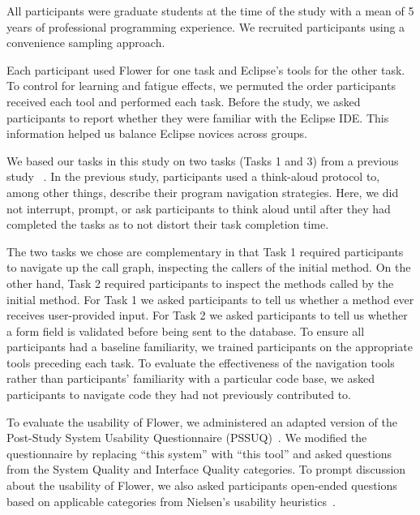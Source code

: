 \documentclass[conference]{IEEEtran}
\begin{document}
All participants were graduate students at the time of the study with a mean of 5 years of professional programming experience. 
We recruited participants using a convenience sampling approach. 

Each participant used Flower for one task and Eclipse's tools for the other task.
To control for learning and fatigue effects, we permuted the order participants received each tool and performed each task. 
Before the study, we asked participants to report whether they were familiar with the Eclipse IDE. This information helped us balance Eclipse novices across groups.



We based our tasks in this study on two tasks (Tasks 1 and 3) from a previous study ~\cite{Smith2015}.
In the previous study, participants used a think-aloud protocol to, among other things, describe their program navigation strategies.
Here, we did not interrupt, prompt, or ask participants to think aloud until after they had completed the tasks as to not distort their task completion time.

The two tasks we chose are complementary in that Task 1 required participants to navigate up the call graph, inspecting the callers of the initial method. 
On the other hand, Task 2 required participants to inspect the methods called by the initial method.
For Task 1 we asked participants to tell us whether a method ever receives user-provided input.
For Task 2 we asked participants to tell us whether a form field is validated before being sent to the database.
To ensure all participants had a baseline familiarity, we trained participants on the appropriate tools preceding each task. 
To evaluate the effectiveness of the navigation tools rather than participants' familiarity with a particular code base, we asked participants to navigate code they had not previously contributed to. 


To evaluate the usability of Flower, we administered an adapted version of the Post-Study System Usability Questionnaire (PSSUQ)~\cite{Lewis95ibmcomputer}. We modified the questionnaire by replacing ``this system'' with ``this tool'' and asked questions from the System Quality and Interface Quality categories.
To prompt discussion about the usability of Flower, we also asked participants open-ended questions based on applicable categories from Nielsen's usability heuristics~\cite{Nielsen1992}.
\end{document}
